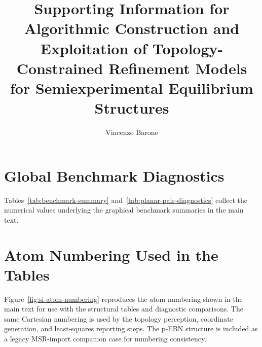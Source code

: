 \documentclass[12pt]{article}
\title{Supporting Information for\\
Algorithmic Construction and Exploitation of Topology-Constrained Refinement Models for Semiexperimental Equilibrium Structures}
\author{Vincenzo Barone}
\date{}
\begin{document}
\maketitle

\section{Global Benchmark Diagnostics}

Tables~\ref{tab:benchmark-summary} and~\ref{tab:planar-pair-diagnostics}
collect the numerical values underlying the graphical benchmark summaries in
the main text.





\section{Atom Numbering Used in the Tables}

Figure~\ref{fig:si-atom-numbering} reproduces the atom numbering shown in the
main text for use with the structural tables and diagnostic comparisons. The
same Cartesian numbering is used by the topology perception, coordinate
generation, and least-squares reporting steps. The p-EBN structure is included
as a legacy MSR-import companion case for numbering consistency.
\end{document}
